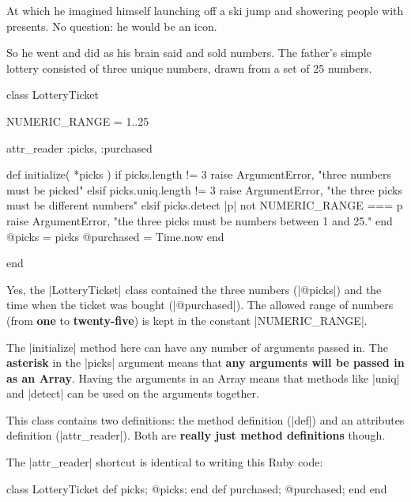 \documentclass[12pt,twoside]{report}
\begin{document}
At which he imagined himself launching off a ski jump and showering
people with presents.  No question: he would be an icon.

So he went and did as his brain said and sold numbers.  The father's
simple lottery consisted of three unique numbers, drawn from a set of
25 numbers.


\begin{rubycode}

 class LotteryTicket

   NUMERIC_RANGE = 1..25

   attr_reader :picks, :purchased

   def initialize( *picks )
     if picks.length != 3
       raise ArgumentError, "three numbers must be picked"
     elsif picks.uniq.length != 3
       raise ArgumentError, "the three picks must be different numbers"
     elsif picks.detect { |p| not NUMERIC_RANGE === p }
       raise ArgumentError, "the three picks must be numbers between 1 and 25."
     end
     @picks = picks
     @purchased = Time.now
   end

 end

\end{rubycode}


Yes, the \rubyinline|LotteryTicket| class contained
the three numbers (\rubyinline|@picks|) and the time
when the ticket was bought (\rubyinline|@purchased|).
The allowed range of numbers (from {\bf one} to {\bf twenty-five}) is
kept in the constant \rubyinline|NUMERIC_RANGE|.

The \rubyinline|initialize| method here can have any
number of arguments passed in.  The {\bf asterisk} in the
\rubyinline|picks| argument means that {\bf any
  arguments will be passed in as an Array}.  Having the arguments in
an Array means that methods like \rubyinline|uniq| and
\rubyinline|detect| can be used on the arguments
together.

This class contains two definitions: the method definition
(\rubyinline|def|) and an attributes definition
(\rubyinline|attr_reader|).  Both are {\bf really just
  method definitions} though.

The \rubyinline|attr_reader| shortcut is identical to
writing this Ruby code:


\begin{rubycode}

 class LotteryTicket
   def picks; @picks; end
   def purchased; @purchased; end
 end

\end{rubycode}
\end{document}
